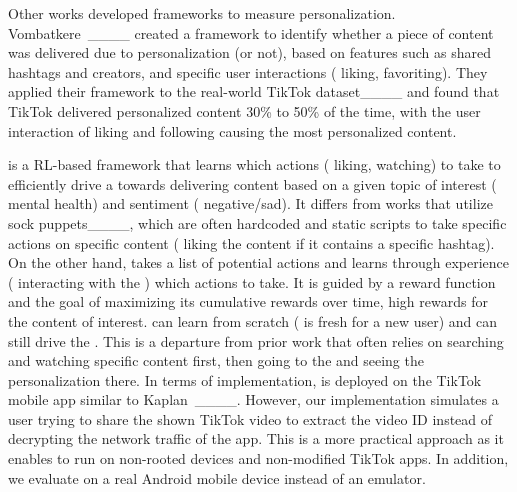 Other works developed frameworks to measure personalization. Vombatkere~\etal{}____ created a framework to identify whether a piece of content was delivered due to personalization (or not), based on features such as shared hashtags and creators, and specific user interactions (\eg{} liking, favoriting). They applied their framework to the real-world TikTok dataset____ and found that TikTok delivered personalized content 30\% to 50\% of the time, with the user interaction of liking and following causing the most personalized content. 

\autolike{} is a RL-based framework that learns which actions (\eg{} liking, watching) to take to efficiently drive a \rs{} towards delivering content based on a given topic of interest (\eg{} mental health) and sentiment (\eg{} negative/sad). It differs from works that utilize sock puppets____, which are often hardcoded and static scripts to take specific actions on specific content (\eg{} liking the content if it contains a specific hashtag). On the other hand, \autolike{} takes a list of potential actions and learns through experience (\ie{} interacting with the \fyp{}) which actions to take. It is guided by a reward function and the goal of maximizing its cumulative rewards over time, \eg{} high rewards for the content of interest. 
\autolike{} can learn from scratch (\fyp{} is fresh for a new user) and can still drive the \rs{}. This is a departure from prior work that often relies on searching and watching specific content first, then going to the \fyp{} and seeing the personalization there.
In terms of implementation, \autolike{} is deployed on the TikTok mobile app similar to Kaplan~\etal{}____. However, our implementation simulates a user trying to share the shown TikTok video to extract the video ID instead of decrypting the network traffic of the app. This is a more practical approach as it enables \autolike{} to run on non-rooted devices and non-modified TikTok apps. In addition, we evaluate \autolike{} on a real Android mobile device instead of an emulator.